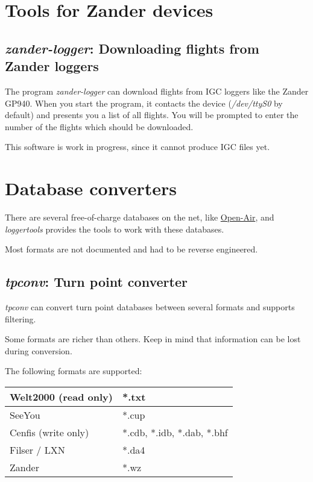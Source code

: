 \documentclass{article}
\begin{document}
\section{Tools for Zander devices}

\subsection{{\em zander-logger}: Downloading flights from Zander loggers}

The program {\em zander-logger} can download flights from IGC loggers
like the Zander GP940.  When you start the program, it contacts the
device ({\em /dev/ttyS0} by default) and presents you a list of all
flights.  You will be prompted to enter the number of the flights
which should be downloaded.

This software is work in progress, since it cannot produce IGC files
yet.


\section{Database converters}

There are several free-of-charge databases on the net, like
\href{http://www.segelflug.de/segelflieger/michael.meier/}{Open-Air},
and {\em loggertools} provides the tools to work with these databases.

Most formats are not documented and had to be reverse engineered.


\subsection{{\em tpconv}: Turn point converter}

{\em tpconv} can convert turn point databases between several formats
and supports filtering.

Some formats are richer than others.  Keep in mind that information
can be lost during conversion.

The following formats are supported:

\begin{tabular}{|l|l|}
\hline
Welt2000 (read only) & *.txt \\
\hline
SeeYou & *.cup \\
\hline
Cenfis (write only) & *.cdb, *.idb, *.dab, *.bhf \\
\hline
Filser / LXN & *.da4 \\
\hline
Zander & *.wz \\
\hline
\end{tabular}
\end{document}
